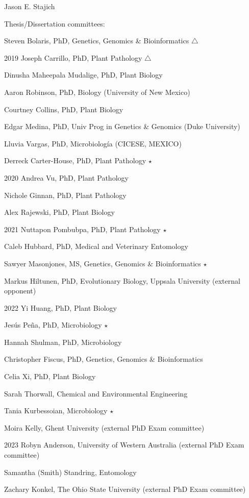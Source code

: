 \documentclass[10pt]{article}
\begin{document}
\begin{cv}{\centerline{Jason E. Stajich}}
\begin{cvlistcompact}{Thesis/Dissertation committees:}
\item Steven Bolaris, PhD, Genetics, Genomics \& Bioinformatics $\triangle$
\item [2019] Joseph Carrillo, PhD, Plant Pathology $\triangle$
\item Dinusha Maheepala Mudalige, PhD, Plant Biology
\item Aaron Robinson, PhD, Biology (University of New Mexico)
\item Courtney Collins, PhD, Plant Biology
\item Edgar Medina, PhD, Univ Prog in Genetics \& Genomics (Duke University)
\item Lluvia Vargas, PhD, Microbiolog\'{i}a (CICESE, MEXICO)
\item Derreck Carter-House, PhD, Plant Pathology $\star$
\item [2020] Andrea Vu, PhD, Plant Pathology
\item Nichole Ginnan, PhD, Plant Pathology
\item Alex Rajewski, PhD, Plant Biology
\item[2021] Nuttapon Pombubpa, PhD, Plant Pathology $\star$
\item Caleb Hubbard, PhD, Medical and Veterinary Entomology
\item Sawyer Masonjones, MS, Genetics, Genomics \& Bioinformatics $\star$
\item Markus Hiltunen, PhD, Evolutionary Biology, Uppsala University (external opponent)
\item [2022] Yi Huang, PhD, Plant Biology
\item Jes\'{u}s Pe\~{n}a, PhD, Microbiology $\star$
\item Hannah Shulman, PhD, Microbiology
\item Christopher Fiscus, PhD, Genetics, Genomics \& Bioinformatics
\item Celia Xi, PhD, Plant Biology
\item Sarah Thorwall, Chemical and Environmental Engineering
\item Tania Kurbessoian, Microbiology $\star$
\item Moira Kelly, Ghent University (external PhD Exam committee)
\item [2023] Robyn Anderson, University of Western Australia (external PhD Exam committee)
\item Samantha (Smith) Standring, Entomology
\item Zachary Konkel, The Ohio State University (external PhD Exam committee)

\end{cvlistcompact}
\end{cv}
\end{document}
